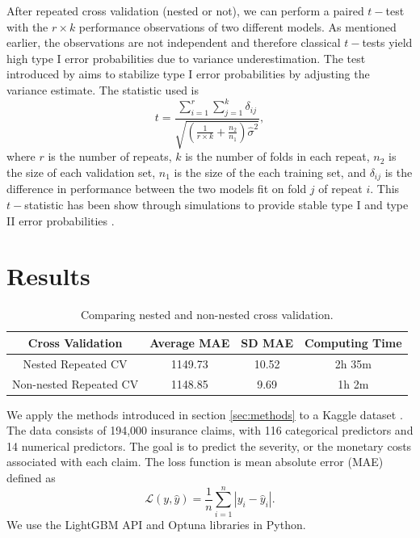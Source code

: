 \documentclass[11pt,a4paper]{article}
\theoremstyle{plain}
\theoremstyle{definition}
\begin{document}
After repeated cross validation (nested or not), we can perform a paired $t-$test with the $r\times k$ performance observations of two different models. As mentioned earlier, the observations are not independent and therefore classical $t-$tests yield high type I error probabilities due to variance underestimation. The test introduced by \citet{ttest} aims to stabilize type I error probabilities by adjusting the variance estimate. The statistic used is 
\begin{equation}
\label{eq:ttest}
t = \frac{\sum_{i = 1}^r \sum_{j = 1}^k \delta_{ij}}{\sqrt{\left(\frac{1}{r\times k} + \frac{n_2}{n_1}\right)\hat{\sigma}^2}},
\end{equation}
where $r$ is the number of repeats, $k$ is the number of folds in each repeat, $n_2$ is the size of each validation set, $n_1$ is the size of the each training set, and $\delta_{ij}$ is the difference in performance between the two models fit on fold $j$ of repeat $i$. This $t-$statistic has been show through simulations to provide stable type I and type II error probabilities \citep{bouckaert}.

\section{Results}
\label{sec:results}

\begin{table}[ht]
\centering
\begin{tabular}{|c|c|c|c|}
\hline
Cross Validation & Average MAE & SD MAE & Computing Time\footnotemark{}\\
\hline
Nested Repeated CV & 1149.73 & 10.52 & 2h 35m\\
Non-nested Repeated CV & 1148.85 & 9.69 & 1h 2m\\
\hline
\end{tabular}
\caption{Comparing nested and non-nested cross validation.}
\label{tbl:cv}
\end{table}

We apply the methods introduced in section \ref{sec:methods} to a Kaggle dataset \citep{allstate-claims-severity}. The data consists of 194,000 insurance claims, with 116 categorical predictors and 14 numerical predictors. The goal is to predict the severity, or the monetary costs associated with each claim. The loss function is mean absolute error (MAE) defined as $$\mathcal{L}(y, \hat{y}) = \frac{1}{n} \sum_{i=1}^n |y_i - \hat{y}_i|.$$ We use the LightGBM API and Optuna libraries in Python.
\end{document}

